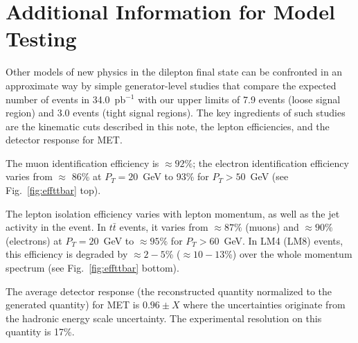 \section{Additional Information for Model Testing}
\label{sec:outreach}

Other models of new physics in the dilepton final state can be confronted in an approximate way by simple 
generator-level studies that compare the expected number of events in 34.0~pb$^{-1}$
with our upper limits of 7.9 events (loose signal region) and 3.0 events (tight signal regions).  
The key ingredients of such studies are the kinematic cuts described 
in this note, the lepton efficiencies, and the detector response for MET.

The muon identification efficiency is $\approx 92\%$;
the electron identification efficiency varies from $\approx$ 86\% at 
$P_T = 20$~GeV to 93\% for $P_T > 50$~GeV (see Fig.~\ref{fig:effttbar} top).

The lepton isolation efficiency varies with lepton momentum, as well as the jet activity in the event.
In $t\bar{t}$ events, it varies from $\approx 87\%$ (muons)
and $\approx 90\%$ (electrons) at $P_T=20$~GeV to $\approx 95\%$ for $P_T>60$~GeV. 
In LM4 (LM8) events, this efficiency is degraded by $\approx 2-5$\% ($\approx 10-13$\%) over the whole momentum 
spectrum (see Fig.~\ref{fig:effttbar} bottom).

The average detector response (the reconstructed quantity normalized to the generated quantity) 
for MET is $0.96 \pm X$ where the uncertainties originate from the hadronic energy scale uncertainty.
The experimental resolution on this quantity is 17\%.


